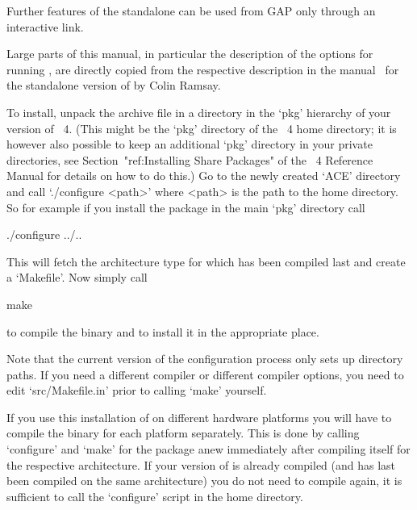 
Further features  of the {\ACE} standalone  can be used  from GAP only
through an interactive link.



Large parts of this manual,  in  particular  the  description  of  the
options for running {\ACE}, are directly copied  from  the  respective
description in the manual~\cite{Ram99} for the standalone  version  of
{\ACE} by Colin Ramsay.



To  install, unpack  the  archive file  in  a directory  in the  `pkg'
hierarchy  of your  version  of  {\GAP}~4. (This  might  be the  `pkg'
directory of the {\GAP}~4 home  directory; it is however also possible
to keep an additional `pkg' directory in your private directories, see
Section~"ref:Installing  Share Packages"  of  the {\GAP}~4   Reference
Manual for details  on how to do this.) Go to  the newly created `ACE'
directory and  call `./configure <path>'  where <path> is the  path to
the {\GAP} home  directory. So for example if  you install the package
in the main `pkg' directory call

\begintt
./configure ../..
\endtt

This  will fetch  the  architecture  type for  which  {\GAP} has  been
compiled last and create a `Makefile'. Now simply call

\begintt
make
\endtt

to compile the binary and to install it in the appropriate place.

Note that the  current version of the configuration  process only sets
up  directory paths.  If you  need a  different compiler  or different
compiler options, you need  to edit `src/Makefile.in' prior to calling
`make' yourself.

If you use this installation of {\GAP} on different hardware platforms
you will have to compile the binary for each platform separately. This
is  done  by calling  `configure'  and  `make'  for the  package  anew
immediately   after  compiling  {\GAP}   itself  for   the  respective
architecture.  If your version of  {\GAP} is already compiled (and has
last  been compiled  on  the same  architecture)  you do  not need  to
compile {\GAP} again, it is  sufficient to call the `configure' script
in the {\GAP} home directory.

